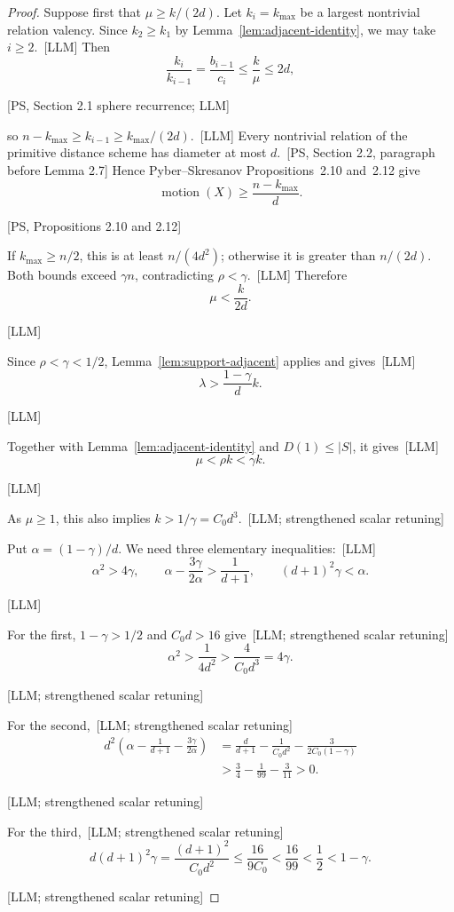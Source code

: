 \documentclass[10pt]{amsart}
\theoremstyle{remark}
\DeclareMathOperator{\motion}{motion}
\newcommand{\prov}[1]{\unskip\, {\normalfont\scriptsize\color{provgray}\textsf{[#1]}}}
\newcommand{\eqprov}[1]{%
  \par\nobreak\vspace{-0.68\baselineskip}%
  \noindent\hfill{\normalfont\scriptsize\color{provgray}\textsf{[#1]}}%
  \par\vspace{0.20\baselineskip}%
}
\begin{document}
\begin{proof}
Suppose first that $\mu\ge k/(2d)$. Let $k_i=k_{\max}$ be a largest nontrivial relation valency. Since $k_2\ge k_1$ by Lemma~\ref{lem:adjacent-identity}, we may take $i\ge2$.\prov{LLM} Then
\[
\frac{k_i}{k_{i-1}}=\frac{b_{i-1}}{c_i}\le\frac{k}{\mu}\le2d,
\]
\eqprov{PS, Section 2.1 sphere recurrence; LLM}
so $n-k_{\max}\ge k_{i-1}\ge k_{\max}/(2d)$.\prov{LLM} Every nontrivial relation of the primitive distance scheme has diameter at most $d$.\prov{PS, Section 2.2, paragraph before Lemma 2.7} Hence Pyber--Skresanov Propositions~2.10 and~2.12 give
\[
\motion(X)\ge\frac{n-k_{\max}}{d}.
\]
\eqprov{PS, Propositions 2.10 and 2.12}
If $k_{\max}\ge n/2$, this is at least $n/(4d^2)$; otherwise it is greater than $n/(2d)$. Both bounds exceed $\gamma n$, contradicting $\rho<\gamma$.\prov{LLM} Therefore
\begin{equation}
\mu<\frac{k}{2d}.
\end{equation}
\eqprov{LLM}

Since $\rho<\gamma<1/2$, Lemma~\ref{lem:support-adjacent} applies and gives\prov{LLM}
\[
\lambda>\frac{1-\gamma}{d}k.
\]
\eqprov{LLM}
Together with Lemma~\ref{lem:adjacent-identity} and $D(1)\le|S|$, it gives\prov{LLM}
\[
\mu<\rho k<\gamma k.
\]
\eqprov{LLM}
As $\mu\ge1$, this also implies $k>1/\gamma=C_0d^3$.\prov{LLM; strengthened scalar retuning}

Put $\alpha=(1-\gamma)/d$. We need three elementary inequalities:\prov{LLM}
\begin{equation}
\alpha^2>4\gamma,\qquad \alpha-\frac{3\gamma}{2\alpha}>\frac1{d+1},\qquad (d+1)^2\gamma<\alpha.
\end{equation}
\eqprov{LLM}
For the first, $1-\gamma>1/2$ and $C_0d>16$ give\prov{LLM; strengthened scalar retuning}
\[
\alpha^2>\frac1{4d^2}>\frac{4}{C_0d^3}=4\gamma.
\]
\eqprov{LLM; strengthened scalar retuning}
For the second,\prov{LLM; strengthened scalar retuning}
\[
\begin{aligned}
d^2\left(\alpha-\frac1{d+1}-\frac{3\gamma}{2\alpha}\right)
&=\frac{d}{d+1}-\frac1{C_0d^2}-\frac{3}{2C_0(1-\gamma)}\\
&>\frac34-\frac1{99}-\frac3{11}>0.
\end{aligned}
\]
\eqprov{LLM; strengthened scalar retuning}
For the third,\prov{LLM; strengthened scalar retuning}
\[
d(d+1)^2\gamma=\frac{(d+1)^2}{C_0d^2}
\le\frac{16}{9C_0}<\frac{16}{99}<\frac12<1-\gamma.
\]
\eqprov{LLM; strengthened scalar retuning}


\end{proof}
\end{document}
